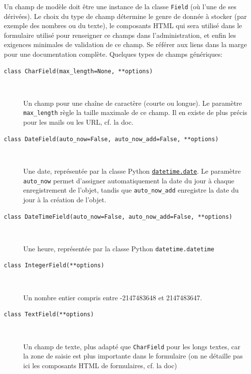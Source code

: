 \documentclass[a4paper, 10pt]{article}
\begin{document}
Un champ  de modèle doit être une instance de la classe \texttt{Field} (où l'une de ses dérivées). Le choix du type de champ détermine le genre de donnée à stocker (par exemple des nombres ou du texte), le composants HTML qui sera utilisé dans le formulaire utilisé pour renseigner ce champs dans l'administration, et enfin les exigences minimales de validation de ce champ. Se référer aux liens dans la marge pour une documentation complète. Quelques types de champs génériques:
\begin{description}
    \item[\texttt{class CharField(max_length=None, **options)}]~

          Un champ pour une chaîne de caractère (courte ou longue). Le paramètre \texttt{max\_length} règle la taille maximale de ce champ. Il en existe de plus précis pour les mails ou les URL, cf. la doc.

    \item[\texttt{class DateField(auto_now=False, auto_now_add=False, **options)}]~

          Une date, représentée par la classe Python \hyperref[datetime]{\texttt{datetime.date}}. Le paramètre \texttt{auto\_now} permet d'assigner automatiquement la date du jour à chaque enregistrement de l'objet, tandis que \texttt{auto\_now\_add} enregistre la date du jour à la création de l'objet.

    \item[\texttt{class DateTimeField(auto_now=False, auto_now_add=False, **options)}]~

          Une heure, représentée par la classe Python \texttt{datetime.datetime}

    \item[\texttt{class IntegerField(**options)}]~

          Un nombre entier compris entre -2147483648 et 2147483647.

    \item[\texttt{class TextField(**options)}]~

          Un champ de texte, plus adapté que \texttt{CharField} pour les longs textes, car la zone de saisie est plus importante dans le formulaire (on ne détaille pas ici les composants HTML de formulaires, cf. la doc)
\end{description}
\end{document}
